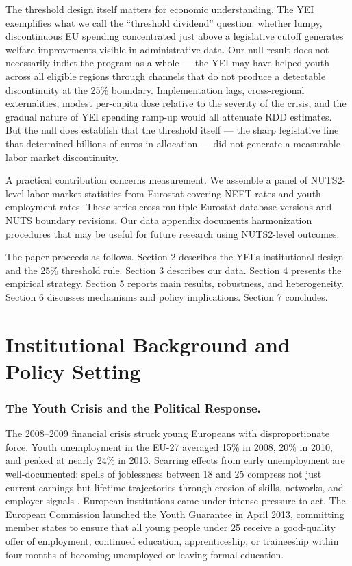 \documentclass[12pt]{article}
\begin{document}
The threshold design itself matters for economic understanding. The YEI exemplifies what we call the ``threshold dividend'' question: whether lumpy, discontinuous EU spending concentrated just above a legislative cutoff generates welfare improvements visible in administrative data. Our null result does not necessarily indict the program as a whole --- the YEI may have helped youth across all eligible regions through channels that do not produce a detectable discontinuity at the 25\% boundary. Implementation lags, cross-regional externalities, modest per-capita dose relative to the severity of the crisis, and the gradual nature of YEI spending ramp-up would all attenuate RDD estimates. But the null does establish that the threshold itself --- the sharp legislative line that determined billions of euros in allocation --- did not generate a measurable labor market discontinuity.

A practical contribution concerns measurement. We assemble a panel of NUTS2-level labor market statistics from Eurostat covering NEET rates and youth employment rates. These series cross multiple Eurostat database versions and NUTS boundary revisions. Our data appendix documents harmonization procedures that may be useful for future research using NUTS2-level outcomes.

The paper proceeds as follows. Section 2 describes the YEI's institutional design and the 25\% threshold rule. Section 3 describes our data. Section 4 presents the empirical strategy. Section 5 reports main results, robustness, and heterogeneity. Section 6 discusses mechanisms and policy implications. Section 7 concludes.

\section{Institutional Background and Policy Setting}

\subsubsection*{The Youth Crisis and the Political Response.} The 2008--2009 financial crisis struck young Europeans with disproportionate force. Youth unemployment in the EU-27 averaged 15\% in 2008, 20\% in 2010, and peaked at nearly 24\% in 2013. Scarring effects from early unemployment are well-documented: spells of joblessness between 18 and 25 compress not just current earnings but lifetime trajectories through erosion of skills, networks, and employer signals \citep{gregg1995scarring, oreopoulos2012short}. European institutions came under intense pressure to act. The European Commission launched the Youth Guarantee in April 2013, committing member states to ensure that all young people under 25 receive a good-quality offer of employment, continued education, apprenticeship, or traineeship within four months of becoming unemployed or leaving formal education.
\end{document}
